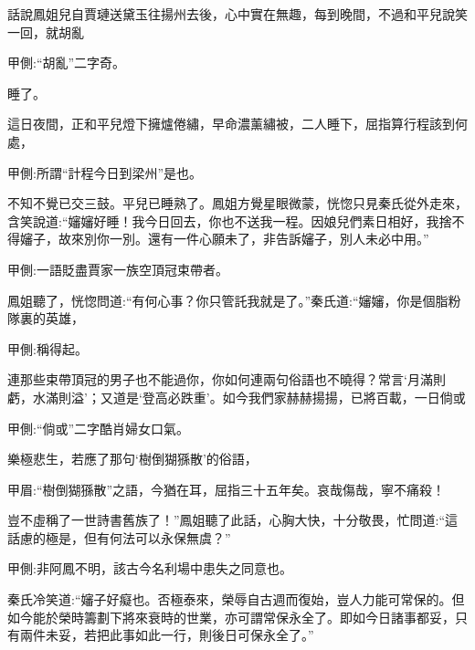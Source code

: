 \begin{parag}
    話說鳳姐兒自賈璉送黛玉往揚州去後，心中實在無趣，每到晚間，不過和平兒說笑一回，就胡亂\begin{note}甲側:“胡亂”二字奇。\end{note}睡了。
\end{parag}


\begin{parag}
    這日夜間，正和平兒燈下擁爐倦繡，早命濃薰繡被，二人睡下，屈指算行程該到何處，\begin{note}甲側:所謂“計程今日到梁州”是也。\end{note}不知不覺已交三鼓。平兒已睡熟了。鳳姐方覺星眼微蒙，恍惚只見秦氏從外走來，含笑說道:“嬸嬸好睡！我今日回去，你也不送我一程。因娘兒們素日相好，我捨不得嬸子，故來別你一別。還有一件心願未了，非告訴嬸子，別人未必中用。”\begin{note}甲側:一語貶盡賈家一族空頂冠束帶者。\end{note}
\end{parag}


\begin{parag}
    鳳姐聽了，恍惚問道:“有何心事？你只管託我就是了。”秦氏道:“嬸嬸，你是個脂粉隊裏的英雄，\begin{note}甲側:稱得起。\end{note}連那些束帶頂冠的男子也不能過你，你如何連兩句俗語也不曉得？常言‘月滿則虧，水滿則溢’；又道是‘登高必跌重’。如今我們家赫赫揚揚，已將百載，一日倘或\begin{note}甲側:“倘或”二字酷肖婦女口氣。\end{note}樂極悲生，若應了那句‘樹倒猢猻散’的俗語，\begin{note}甲眉:“樹倒猢猻散”之語，今猶在耳，屈指三十五年矣。哀哉傷哉，寧不痛殺！\end{note}豈不虛稱了一世詩書舊族了！”鳳姐聽了此話，心胸大快，十分敬畏，忙問道:“這話慮的極是，但有何法可以永保無虞？”\begin{note}甲側:非阿鳳不明，該古今名利場中患失之同意也。\end{note}秦氏冷笑道:“嬸子好癡也。否極泰來，榮辱自古週而復始，豈人力能可常保的。但如今能於榮時籌劃下將來衰時的世業，亦可謂常保永全了。即如今日諸事都妥，只有兩件未妥，若把此事如此一行，則後日可保永全了。”
\end{parag}



